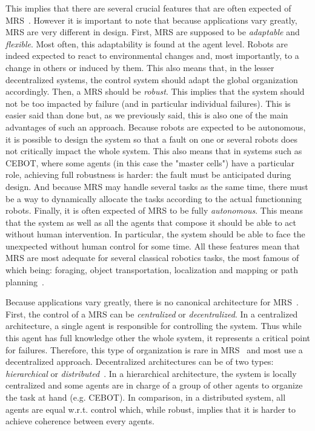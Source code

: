     This implies that there are several crucial features that are often expected of MRS~\parencite{Parker1994}. However it is important to note that because applications vary greatly, MRS are very different in design. First, MRS are supposed to be \emph{adaptable} and \emph{flexible}. Most often, this adaptability is found at the agent level. Robots are indeed expected to react to environmental changes and, most importantly, to a change in others or induced by them. This also means that, in the lesser decentralized systems, the control system should adapt the global organization accordingly. Then, a MRS should be \emph{robust}. This implies that the system should not be too impacted by failure (and in particular individual failures). This is easier said than done but, as we previously said, this is also one of the main advantages of such an approach. Because robots are expected to be autonomous, it is possible to design the system so that a fault on one or several robots does not critically impact the whole system. This also means that in systems such as CEBOT, where some agents (in this case the "master cells") have a particular role, achieving full robustness is harder: the fault must be anticipated during design. And because MRS may handle several tasks as the same time, there must be a way to dynamically allocate the tasks according to the actual functionning robots. Finally, it is often expected of MRS to be fully \emph{autonomous}. This means that the system as well as all the agents that compose it should be able to act without human intervention. In particular, the system should be able to face the unexpected without human control for some time. All these features mean that MRS are most adequate for several classical robotics tasks, the most famous of which being: foraging, object transportation, localization and mapping or path planning~\parencite{Farinelli2004}.

    Because applications vary greatly, there is no canonical architecture for MRS~\parencite{Cao1997, Parker2008}. First, the control of a MRS can be \emph{centralized} or \emph{decentralized}. In a centralized architecture, a single agent is responsible for controlling the system. Thus while this agent has full knowledge other the whole system, it represents a critical point for failures. Therefore, this type of organization is rare in MRS~\parencite{Parker2008} and most use a decentralized approach. Decentralized architectures can be of two types: \emph{hierarchical} or \emph{distributed}~\parencite{Cao1997}. In a hierarchical architecture, the system is locally centralized and some agents are in charge of a group of other agents to organize the task at hand (e.g. CEBOT). In comparison, in a distributed system, all agents are equal w.r.t. control which, while robust, implies that it is harder to achieve coherence between every agents.

